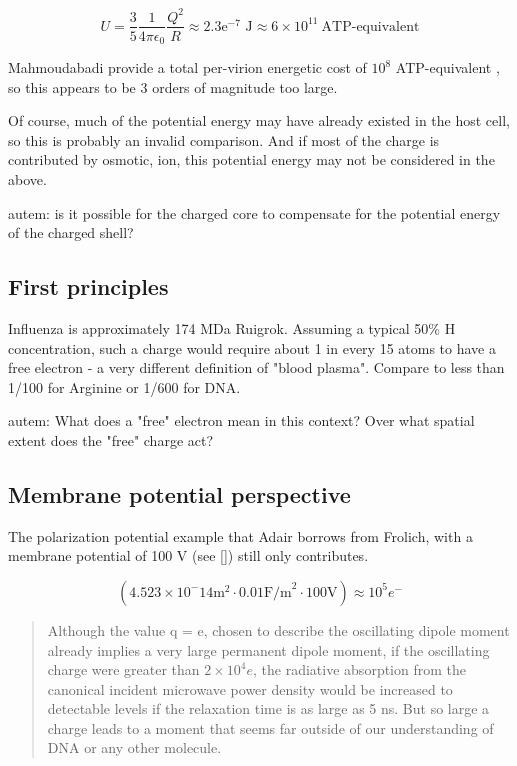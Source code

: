 \documentclass[paper.tex]{subfiles}
\begin{document}
$$ U = \frac{3}{5}  \frac{1}{4 \pi \epsilon_0} \frac{Q^2}{R} \approx 2.3\text{e}^{-7} \text{ J} \approx 6 \times 10^{11}\  \text{ATP-equivalent} $$



Mahmoudabadi\cite{Energetic2017} provide a total per-virion energetic cost of $10^8 $ ATP-equivalent , so this appears to be 3 orders of magnitude too large.

Of course, much of the potential energy may have already existed in the host cell, so this is probably an invalid comparison. And if most of the charge is contributed by osmotic, ion, this potential energy may not be considered in the above. 

\begin{autem}
	autem: is it possible for the charged core to compensate for the potential energy of the charged shell?
\end{autem}

\subsection{First principles}

Influenza is approximately 174 MDa Ruigrok. Assuming a typical 50\% H concentration, such a charge would require about 1 in every 15 atoms to have a free electron - a very different definition of "blood plasma". Compare to less than 1/100 for Arginine or 1/600 for DNA. 

\begin{autem}
	autem: What does a "free" electron mean in this context? Over what spatial extent does the "free" charge act?
\end{autem}



\subsection{Membrane potential perspective}


The polarization potential example that Adair borrows from Frolich, with a membrane potential of 100 V (see []) still only contributes.  

$$(4.523 \times 10^-14 \text{m}^2 \cdot 0.01 \text{F/m}^2 \cdot 100 \text{V}) \approx 10^5 e^- $$



\cite{Vibrational2002}
\begin{quote}
	Although the value q = e, chosen to describe the oscillating dipole moment already implies a very large permanent dipole moment, if the oscillating charge were greater
	than $2\times 10^4 e$, the radiative absorption from the canonical
	incident microwave power density would be increased to
	detectable levels if the relaxation time is as large as 5 ns.
	But so large a charge leads to a moment that seems far
	outside of our understanding of DNA or any other molecule.
	
	

\end{quote}
\end{document}

